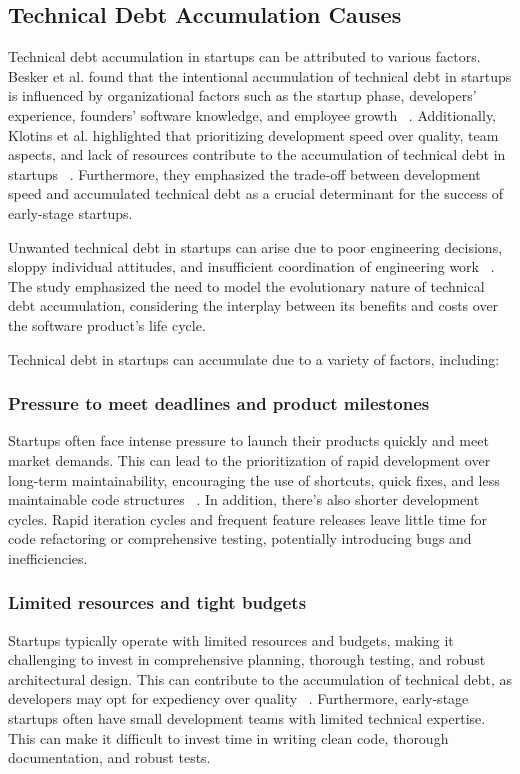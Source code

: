 \subsection{Technical Debt Accumulation Causes}
Technical debt accumulation in startups can be attributed to various factors. Besker et al. found that the intentional accumulation of technical debt in startups is influenced by organizational factors such as the startup phase, developers' experience, founders' software knowledge, and employee growth ~\cite{Besker2018}. Additionally, Klotins et al. highlighted that prioritizing development speed over quality, team aspects, and lack of resources contribute to the accumulation of technical debt in startups ~\cite{Klotins:2018:ETD}. Furthermore, they emphasized the trade-off between development speed and accumulated technical debt as a crucial determinant for the success of early-stage startups.

Unwanted technical debt in startups can arise due to poor engineering decisions, sloppy individual attitudes, and insufficient coordination of engineering work ~\cite{Klotins882019}. The study emphasized the need to model the evolutionary nature of technical debt accumulation, considering the interplay between its benefits and costs over the software product's life cycle.

Technical debt in startups can accumulate due to a variety of factors, including:
\subsubsection{Pressure to meet deadlines and product milestones}
Startups often face intense pressure to launch their products quickly and meet market demands. This can lead to the prioritization of rapid development over long-term maintainability, encouraging the use of shortcuts, quick fixes, and less maintainable code structures ~\cite{Klotins:2018:ETD,Qualityv77:online}. In addition, there's also shorter development cycles. Rapid iteration cycles and frequent feature releases leave little time for code refactoring or comprehensive testing, potentially introducing bugs and inefficiencies.

\subsubsection{Limited resources and tight budgets}
Startups typically operate with limited resources and budgets, making it challenging to invest in comprehensive planning, thorough testing, and robust architectural design. This can contribute to the accumulation of technical debt, as developers may opt for expediency over quality ~\cite{FowlerBottlenecks,Balancin62:online}. Furthermore, early-stage startups often have small development teams with limited technical expertise. This can make it difficult to invest time in writing clean code, thorough documentation, and robust tests.

